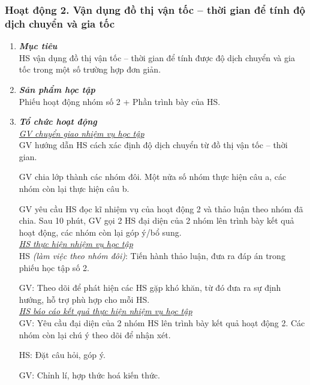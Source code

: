 \subsubsection{Hoạt động 2. Vận dụng đồ thị vận tốc – thời gian để tính độ dịch chuyển và gia tốc}
\begin{enumerate}[label=\bfseries\itshape\arabic*.]
	\item \textbf{\textit{Mục tiêu}}\\
	HS vận dụng đồ thị vận tốc – thời gian để tính được độ dịch chuyển và gia tốc trong một số trường hợp đơn giản.
	\item \textbf{\textit{Sản phẩm học tập}}\\
	Phiếu hoạt động nhóm số 2 + Phần trình bày của HS.
	\item \textbf{\textit{Tổ chức hoạt động}}\\
	\textit{\underline{GV chuyển giao nhiệm vụ học tập}}\\
	GV hướng dẫn HS cách xác định độ dịch chuyển từ đồ thị vận tốc – thời gian.

 GV chia lớp thành các nhóm đôi. Một nửa số nhóm thực hiện câu a, các nhóm còn lại thực hiện câu b. 

GV yêu cầu HS đọc kĩ nhiệm vụ của hoạt động 2 và thảo luận theo nhóm đã chia. Sau 10 phút, GV gọi 2 HS đại diện của 2 nhóm lên trình bày kết quả hoạt động, các nhóm còn lại góp ý/bổ sung.\\
\textit{\underline{HS thực hiện nhiệm vụ học tập}}\\
HS \textit{(làm việc theo nhóm đôi)}: Tiến hành thảo luận, đưa ra đáp án trong phiếu học tập số 2. 

GV: Theo dõi để phát hiện các HS gặp khó khăn, từ đó đưa ra sự định hướng, hỗ trợ phù hợp cho mỗi HS.\\
\textit{\underline{HS báo cáo kết quả thực hiện nhiệm vụ học tập}}\\
GV: Yêu cầu đại diện của 2 nhóm HS lên trình bày kết quả hoạt động 2. Các nhóm còn lại chú ý theo dõi để nhận xét.

HS: Đặt câu hỏi, góp ý.

GV: Chỉnh lí, hợp thức hoá kiến thức.


\end{enumerate}
